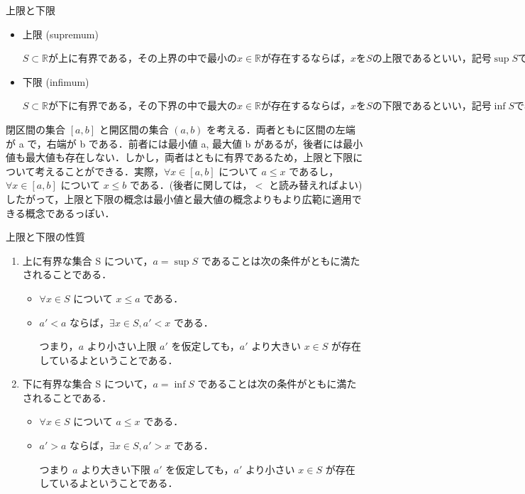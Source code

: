 \documentclass[a4paper]{ltjsarticle}
\begin{document}
\pagebreak

\begin{mytcb}{上限と下限}{}
\begin{itemize}
\item 上限 (supremum)

\begin{math}
S \subset \mathbb{R} が上に有界である，その上界の中で最小の x \in \mathbb{R} が存在するならば， x を S の上限であるといい，記号 \sup S で表す．つまり，U(S) があって \min U(S) が存在するならば，それを \sup S と表す．
\end{math}
\item 下限 (infimum)

\begin{math}
S \subset \mathbb{R} が下に有界である，その下界の中で最大の x \in \mathbb{R} が存在するならば，x を S の下限であるといい，記号 \inf S で表す．つまり L(S) をもつとき，\max L(S)  が存在するならば，それを \inf S と表す．
\end{math}
\end{itemize}
\end{mytcb}

閉区間の集合 $[a, b]$ と開区間の集合 $(a, b)$ を考える．両者ともに区間の左端が a で，右端が b である．前者には最小値 a, 最大値 b があるが，後者には最小値も最大値も存在しない．しかし，両者はともに有界であるため，上限と下限について考えることができる．実際，$\forall x \in [a, b]$ について $ a \leq x$ であるし，$\forall x \in [a, b]$ について $x \leq b$ である．(後者に関しては，$<$ と読み替えればよい) \\ したがって，上限と下限の概念は最小値と最大値の概念よりもより広範に適用できる概念であるっぽい．

\begin{mytcb}{上限と下限の性質}{}

\begin{enumerate}
\item 上に有界な集合 S について，$a = \sup S$ であることは次の条件がともに満たされることである．
\begin{itemize}
\item[(a) ] $\forall x \in S$ について $x \leq a$ である．
\item[(b) ] $a' < a$ ならば，$\exists x \in S, a' < x$ である．

つまり，$a$ より小さい上限 $a'$ を仮定しても，$a'$ より大きい $x \in S$ が存在しているよということである．
\end{itemize}
\item 下に有界な集合 S について，$a = \inf S$ であることは次の条件がともに満たされることである．
\begin{itemize}
\item[(a) ] $\forall x \in S$ について $a \leq x$ である．
\item[(b) ] $a' > a$ ならば，$\exists x \in S, a' > x$ である．

つまり $a$ より大きい下限 $a'$ を仮定しても，$a'$ より小さい $x \in S$ が存在しているよということである．
\end{itemize}
\end{enumerate}

\end{mytcb}
\end{document}
